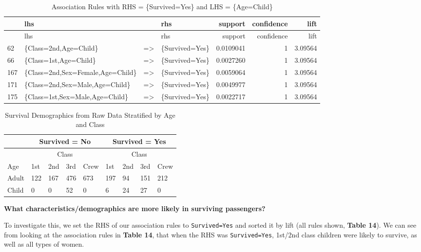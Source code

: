 \documentclass[]{article}
\begin{document}
\begin{longtable}[c]{@{}llllrrr@{}}
\caption{Association Rules with RHS = \{Survived=Yes\} and LHS =
\{Age=Child\}}\tabularnewline
\toprule
& lhs & & rhs & support & confidence & lift\tabularnewline
\midrule
\endfirsthead
\toprule
& lhs & & rhs & support & confidence & lift\tabularnewline
\midrule
\endhead
62 & \{Class=2nd,Age=Child\} & =\textgreater{} & \{Survived=Yes\} &
0.0109041 & 1 & 3.09564\tabularnewline
66 & \{Class=1st,Age=Child\} & =\textgreater{} & \{Survived=Yes\} &
0.0027260 & 1 & 3.09564\tabularnewline
167 & \{Class=2nd,Sex=Female,Age=Child\} & =\textgreater{} &
\{Survived=Yes\} & 0.0059064 & 1 & 3.09564\tabularnewline
171 & \{Class=2nd,Sex=Male,Age=Child\} & =\textgreater{} &
\{Survived=Yes\} & 0.0049977 & 1 & 3.09564\tabularnewline
175 & \{Class=1st,Sex=Male,Age=Child\} & =\textgreater{} &
\{Survived=Yes\} & 0.0022717 & 1 & 3.09564\tabularnewline
\bottomrule
\end{longtable}

\begin{table}[h]
\centering
\begin{tabular}{|l|l|l|l|l|l|l|l|l|}
\hline
        & \multicolumn{4}{|c|}{Survived = No}    & \multicolumn{4}{|c|}{Survived = Yes}  \\ \hline  
        & \multicolumn{4}{|c|}{Class}            & \multicolumn{4}{|c|}{Class}           \\ \hline    
Age     & 1st & 2nd  & 3rd & Crew                & 1st & 2nd & 3rd & Crew                \\ \hline
Adult   & 122 & 167  & 476 & 673                 & 197 & 94  & 151 & 212                 \\ \hline
Child   & 0   & 0    & 52  & 0                   & 6   & 24  & 27  & 0                   \\ \hline
\end{tabular}
\caption{Survival Demographics from Raw Data Stratified by Age and Class}
\label{my-label}
\end{table}

\textbf{What characteristics/demographics are more likely in surviving passengers?}

To investigate this, we set the RHS of our association rules to
\texttt{Survived=Yes} and sorted it by lift (all rules shown,
\textbf{Table 14}). We can see from looking at the association rules in
\textbf{Table 14}, that when the RHS was \texttt{Survived=Yes}, 1st/2nd
class children were likely to survive, as well as all types of women.
\end{document}
